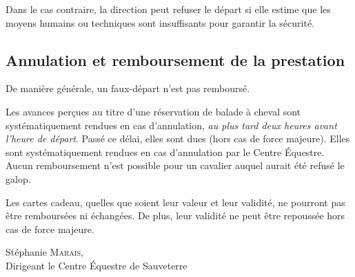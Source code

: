 \documentclass[11pt,a4paper]{article}
\begin{document}
   Dans le cas contraire, la direction peut refuser le départ si elle estime que les moyens humains ou techniques sont insuffisants pour garantir la sécurité.

   \subsection*{Annulation et remboursement de la prestation}
   De manière générale, un faux-départ n'est pas remboursé.

   Les avances perçues au titre d'une réservation de balade à cheval sont systématiquement rendues en cas d'annulation, \emph{au plus tard deux heures avant l'heure de départ}.
   Passé ce délai, elles sont dues (hors cas de force majeure).
   Elles sont systématiquement rendues en cas d'annulation par le Centre Équestre.\\

   Aucun remboursement n'est possible pour un cavalier auquel aurait été refusé le galop.

   Les cartes cadeau, quelles que soient leur valeur et leur validité, ne pourront pas être remboursées ni échangées.
   De plus, leur validité ne peut être repoussée hors cas de force majeure.

   \vfill

   \hspace{.55\textwidth}
   \begin{minipage}{.4\textwidth}
      \begin{center}
         Stéphanie \textsc{Marais},\\
         Dirigeant le Centre Équestre de Sauveterre
      \end{center}
   \end{minipage}
\end{document}
